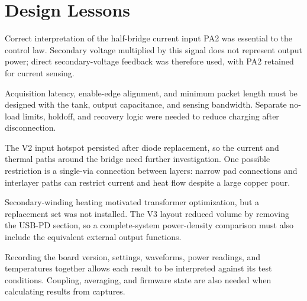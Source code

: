\section{Design Lessons}
\label{sec:disc-lessons}

Correct interpretation of the half-bridge current input PA2 was essential
to the control law. Secondary voltage multiplied by this signal does not
represent output power; direct secondary-voltage feedback was therefore
used, with PA2 retained for current sensing.

Acquisition latency, enable-edge alignment, and minimum packet length
must be designed with the tank, output capacitance, and sensing bandwidth.
Separate no-load limits, holdoff, and recovery logic were needed to reduce
charging after disconnection.

The V2 input hotspot persisted after diode replacement, so the current and
thermal paths around the bridge need further investigation. One possible
restriction is a single-via connection between layers: narrow pad connections
and interlayer paths can restrict current and heat flow despite a large
copper pour.

Secondary-winding heating motivated transformer optimization, but a
replacement set was not installed. The V3 layout reduced volume by removing
the USB-PD section, so a complete-system power-density comparison must also
include the equivalent external output functions.

Recording the board version, settings, waveforms, power readings, and
temperatures together allows each result to be interpreted against its test
conditions. Coupling, averaging, and firmware state are also needed when
calculating results from captures.
